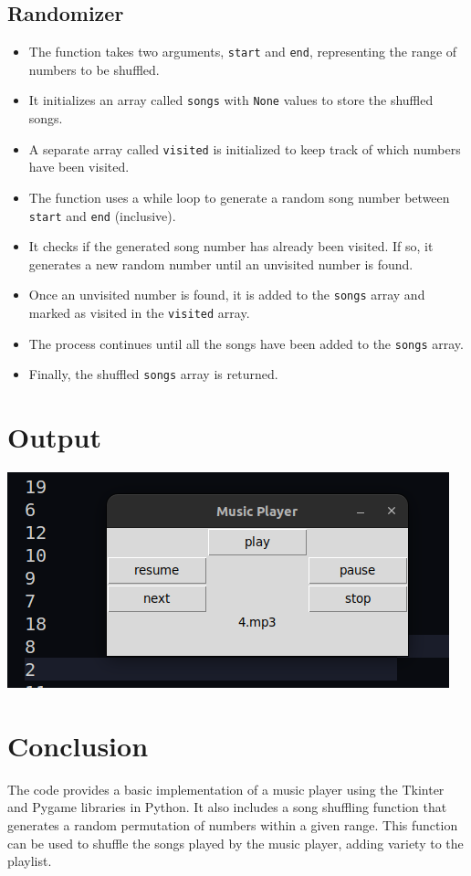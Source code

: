 \documentclass[journal,12pt,twocolumn]{IEEEtran}
\begin{document}
\subsection{Randomizer}
\begin{itemize}
  \item The function takes two arguments, \texttt{start} and \texttt{end}, representing the range of numbers to be shuffled.
  \item It initializes an array called \texttt{songs} with \texttt{None} values to store the shuffled songs.
  \item A separate array called \texttt{visited} is initialized to keep track of which numbers have been visited.
  \item The function uses a while loop to generate a random song number between \texttt{start} and \texttt{end} (inclusive).
  \item It checks if the generated song number has already been visited. If so, it generates a new random number until an unvisited number is found.
  \item Once an unvisited number is found, it is added to the \texttt{songs} array and marked as visited in the \texttt{visited} array.
  \item The process continues until all the songs have been added to the \texttt{songs} array.
  \item Finally, the shuffled \texttt{songs} array is returned.
\end{itemize}


\section{Output}
\includegraphics[scale=0.5]{images/Output.png}

\section{Conclusion}
The code provides a basic implementation of a music player using the Tkinter and Pygame libraries in Python. It also includes a song shuffling function that generates a random permutation of numbers within a given range. This function can be used to shuffle the songs played by the music player, adding variety to the playlist.
\end{document}
